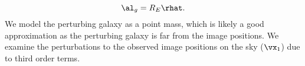 \begin{equation}
\al_g = R_E \rhat.
\end{equation}
We model the perturbing galaxy as a point mass, which is likely a good approximation as the perturbing galaxy is far from the image positions. We examine the perturbations to the observed image positions on the sky ($\vx_1$) due to third order terms.